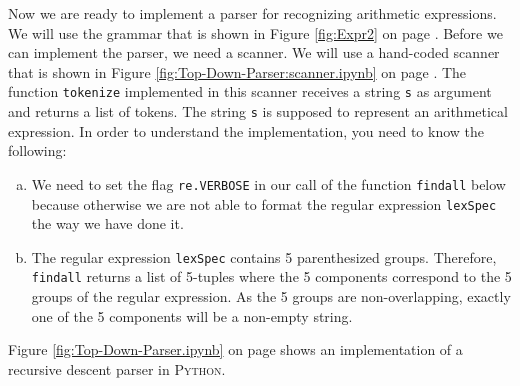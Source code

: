 \noindent
Now we are ready to implement a parser for recognizing arithmetic expressions.
We will use the grammar that is shown in Figure \ref{fig:Expr2} on page \pageref{fig:Expr2}.
Before we can implement the parser, we need a scanner.  We will use a hand-coded scanner that is shown in
Figure \ref{fig:Top-Down-Parser:scanner.ipynb} on page \pageref{fig:Top-Down-Parser:scanner.ipynb}.
The function \texttt{tokenize} implemented in this scanner receives a string \texttt{s} as argument and returns
a list of tokens.  The string \texttt{s} is supposed to represent an arithmetical expression. 
In order to understand the implementation, you need to know the following:
\begin{enumerate}[(a)]
\item We need to set the flag \texttt{re.VERBOSE} in our call of the function \texttt{findall}
      below because otherwise we are not able to format the regular expression \texttt{lexSpec} the way 
      we have done it.
\item The regular expression \texttt{lexSpec} contains 5 parenthesized groups.  Therefore,
      \texttt{findall} returns a list of 5-tuples where the 5 components correspond to the 5
      groups of the regular expression.  As the 5 groups are non-overlapping, exactly one of the 5 components
      will be a non-empty string.
\end{enumerate}
Figure \ref{fig:Top-Down-Parser.ipynb} on page
\pageref{fig:Top-Down-Parser.ipynb} shows an implementation of a recursive descent parser in
\textsc{Python}. 
